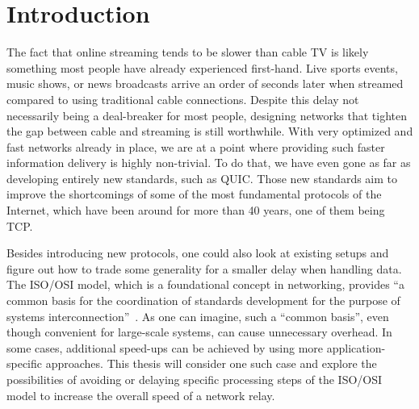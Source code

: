 
\chapter{Introduction}\label{chap:introduction}


The fact that online streaming tends to be slower than cable TV is likely something most people have already 
experienced first-hand.
Live sports events, music shows, or news broadcasts arrive an order of seconds later when streamed compared
to using traditional cable connections. %
Despite this delay not necessarily being a deal-breaker for most people, designing networks that 
tighten the gap between cable and streaming is still worthwhile.
With very optimized and fast networks already in place, we are at a point where providing such faster information
delivery is highly non-trivial.
To do that, we have even gone as far as developing entirely new standards, such as QUIC\@. 
Those new standards aim to improve the shortcomings of some of the most fundamental protocols of the Internet, which have been around for more than 40 years, one of them being TCP\@. 


Besides introducing new protocols, one could also look at existing setups and figure out how to trade some generality
for a smaller delay when handling data.
The ISO/OSI model, which is a foundational concept in networking, provides ``a common basis for the coordination 
of standards development for the purpose of systems interconnection''~\parencite{iso-osi-standard}.
As one can imagine, such a ``common basis'', even though convenient for large-scale systems, can cause unnecessary
overhead.
In some cases, additional speed-ups can be achieved by using more application-specific approaches.
This thesis will consider one such case and explore the possibilities of avoiding or delaying specific processing
steps of the ISO/OSI model to increase the overall speed of a network relay.






